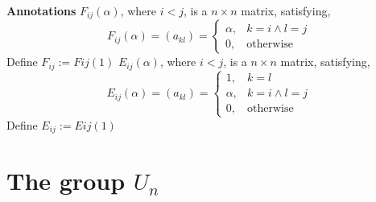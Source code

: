 \documentclass[12pt]{article}
\begin{document}
\textbf{Annotations}\newline
\textbf{$F_{ij}(\alpha)$}, where $i<j$, is a $n \times n$ matrix, satisfying, 
$$
F_{ij}(\alpha)=(a_{kl})=\begin{cases}
			\alpha, & k=i \land l=j\\
            0, & \text{otherwise}
		 \end{cases}
$$
Define $F_{ij}:=F{ij}(1)$ \newline
\textbf{$E_{ij}(\alpha)$}, where $i<j$, is a $n \times n$ matrix, satisfying, 
$$
E_{ij}(\alpha)=(a_{kl})=\begin{cases}
            1, & k=l\\
			\alpha, & k=i \land l=j\\
            0, & \text{otherwise}
		 \end{cases}
$$
Define $E_{ij}:=E{ij}(1)$ \newline

\section{The group $U_n$}
\end{document}
